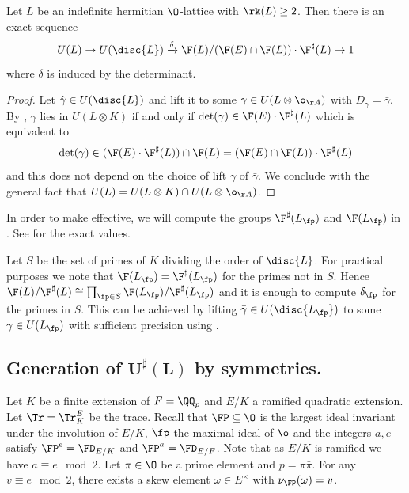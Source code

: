 \begin{theorem}\label{hermitianUtoUDL}
 Let $L$ be an indefinite hermitian $\O$-lattice with $\rk(L)\geq 2$. Then there is an exact sequence
 \[U(L)\rightarrow U(\disc{L}) \xrightarrow[]{\delta} \F(L)/(\F(E)\cap \F(L))\cdot \F^\sharp(L) \rightarrow 1\]
 where $\delta$ is induced by the determinant.
\end{theorem}
\begin{proof}

Let $\hat\gamma \in U(\disc{L})$ and lift it to some $\gamma \in U(L \otimes \o_{\AA})$ with $D_{\gamma}=\bar \gamma$.
By , $\gamma$ lies in $U(L\otimes K)$ if and only if $\det(\gamma) \in \F(E)\cdot \F^\sharp(L)$
which is equivalent to
\[\det(\gamma) \in (\F(E)\cdot \F^\sharp(L)) \cap \F(L)= (\F(E) \cap \F(L)) \cdot \F^\sharp(L) \]
and this does not depend on the choice of lift $\gamma$ of $\bar \gamma$.
We conclude with the general fact that $U(L) = U(L \otimes K) \cap U(L \otimes \o_{\AA})$.
\end{proof}
In order to make  effective,
we will compute the groups $\F^\sharp(L_\fp)$ and $\F(L_\fp)$ in  . See  for the exact values.

\begin{remark}\label{rem:hermitianUtoUDL}
Let $S$ be the set of primes of $K$ dividing the order of $\disc{L}$.
For practical purposes we note that $\F(L_\fp)=\F^\sharp(L_\fp)$ for the primes not in $S$.
Hence $\F(L)/\F^\sharp(L)\cong \prod_{\fp \in S}\F(L_\fp)/\F^\sharp(L_\fp)$ and it is enough to compute $\delta_\fp$ for the primes in $S$.
This can be achieved by lifting $\bar \gamma \in U(\disc{L_\fp})$ to some $\gamma \in U(L_\fp)$ with sufficient precision using .
\end{remark}

\subsection{Generation of $\mathbf{U^\sharp(L)}$ by symmetries.}\label{kergen}

Let $K$ be a finite extension of $F= \QQ_p$ and $E/K$ a ramified quadratic extension. Let $\Tr = \Tr^E_K$ be the trace.
Recall that $\FP\subseteq \O$ is the largest ideal invariant under the involution of $E/K$, $\fp$ the maximal ideal of $\o$ and the integers $a, e$ satisfy $\FP^e = \FD_{E/K}$ and $\FP^a = \FD_{E/F}$.
Note that as $E/K$ is ramified we have $a \equiv e \mod 2$.
Let $\pi \in \O$ be a prime element and $p = \pi \bar \pi$.
For any $v \equiv e \mod 2$,
there exists a skew element $\omega \in E^\times$ with $\nu_\FP(\omega)=v$.

